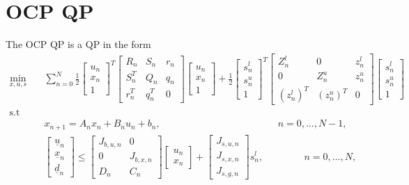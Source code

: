 \documentclass[a4paper]{report}
\begin{document}
\chapter{OCP QP}

The OCP QP is a QP in the form
\begin{align*}
\min_{x,u,s} & \quad \sum_{n=0}^N \frac 1 2 \begin{bmatrix} u_n \\ x_n \\ 1 \end{bmatrix}^T \begin{bmatrix} R_n & S_n & r_n \\ S_n^T & Q_n & q_n \\ r_n^T & q_n^T & 0 \end{bmatrix} \begin{bmatrix} u_n \\ x_n \\ 1 \end{bmatrix} + \frac 1 2 \begin{bmatrix} s^l_n \\ s^u_n \\ 1 \end{bmatrix}^T \begin{bmatrix} Z^l_n & 0 & z^l_n \\ 0 & Z^u_n & z^u_n \\ (z^l_n)^T & (z^u_n)^T & 0 \end{bmatrix} \begin{bmatrix} s^l_n \\ s^u_n \\ 1 \end{bmatrix} \\
\text{s.t}  & & \\
     & \quad x_{n+1} = A_n x_n + B_n u_n + b_n, \qquad \qquad \qquad \qquad \qquad \qquad n=0,\dots,N-1, &\\
     & \quad \begin{bmatrix} \underline u_n \\ \underline x_n \\ \underline d_n \end{bmatrix} \leq \begin{bmatrix} J_{b,u,n} & 0 \\ 0 & J_{b,x,n} \\ D_n & C_n \end{bmatrix} \begin{bmatrix} u_n \\ x_n \end{bmatrix} + \begin{bmatrix} J_{s,u,n} \\ J_{s,x,n} \\ J_{s,g,n} \end{bmatrix} s^l_n, \quad \qquad \quad \,n=0,\dots,N, &\\

\end{align*}
\end{document}
